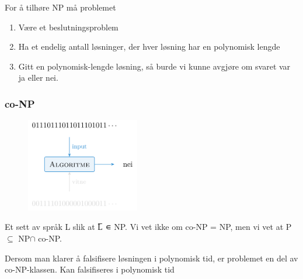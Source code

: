 \documentclass[12pt]{report}
\begin{document}
\par

For å tilhøre NP må problemet\par

\begin{enumerate}
	\item Være et beslutningsproblem\par

	\item Ha et endelig antall løsninger, der hver løsning har en polynomisk lengde\par

	\item Gitt en polynomisk-lengde løsning, så burde vi kunne avgjøre om svaret var ja eller nei.
\end{enumerate}\par


\vspace{\baselineskip}
\subsubsection*{co-NP}



\begin{figure}[H]
\advance\leftskip 5.02in		\includegraphics[width=1.95in,height=1.61in]{./media/image154.png}
\end{figure}



Et sett av språk L slik at L̅ ∊ NP. Vi vet ikke om co-NP = NP, men vi vet at P $ \subseteq $  NP$ \cap $ co-NP. \par

\setlength{\parskip}{10.56pt}
Dersom man klarer å falsifisere løsningen i polynomisk tid, er problemet en del av co-NP-klassen.  Kan falsifiseres i polynomisk tid\par


\vspace{\baselineskip}
\end{document}
